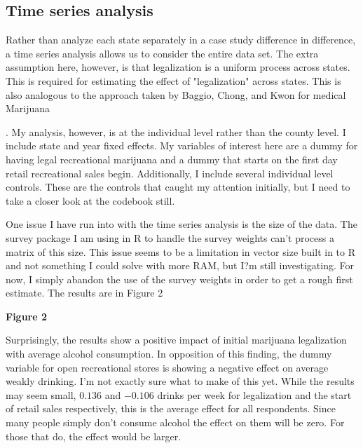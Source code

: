 \documentclass[11pt]{article}
\begin{document}
\subsection{Time series analysis}

Rather than analyze each state separately in a case study difference in difference, a time series analysis allows us to consider the entire data set. The extra assumption here, however, is that legalization is a uniform process across states. This is required for estimating the effect of "legalization" across states. This is also analogous to the approach taken by Baggio, Chong, and Kwon for medical Marijuana \cite{baggio_chong_kwon_2018} \par. My analysis, however, is at the individual level rather than the county level. I include state and year fixed effects.  My variables of interest here are a dummy for having legal recreational marijuana and a dummy that starts on the first day retail recreational sales begin. Additionally, I include several individual level controls. These are the controls that caught my attention initially, but I need to take a closer look at the codebook still.

One issue I have run into with the time series analysis is the size of the data. The survey package I am using in R to handle the survey weights can't process a matrix of this size. This issue seems to be a limitation in vector size built in to R and not something I could solve with more RAM, but I?m still investigating. For now, I simply abandon the use of the survey weights in order to get a rough first estimate. The results are in Figure 2 \par

\begin{center}

	\centering
	\textbf{Figure 2}\par\medskip
	
\end{center}


Surprisingly, the results show a positive impact of initial marijuana legalization with average alcohol consumption. In opposition of this finding, the dummy variable for open recreational stores is showing a negative effect on average weakly drinking. I'm not exactly sure what to make of this yet. While the results may seem small, $0.136$ and $-0.106$ drinks per week for legalization and the start of retail sales respectively, this is the average effect for all respondents. Since many people simply don't consume alcohol the effect on them will be zero. For those that do, the effect would be larger.  \par
\end{document}
